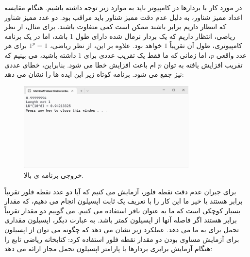 {
    \Large
    \begin{spacing}{1.5}
        در مورد کار با بردارها در کامپیوتر باید به موارد زیر توجه داشته باشیم.
        هنگام مقایسه اعداد ممیز شناور، به دلیل عدم دقت ممیز شناور باید مراقب بود.
        دو عدد ممیز شناور که انتظار داریم برابر باشند ممکن است کمی متفاوت باشند.
        برای مثال، از نظر ریاضی، انتظار داریم که یک بردار نرمال شده دارای طول 1 باشد، اما در یک برنامه کامپیوتری، طول آن تقریباً $1$ خواهد بود.
        علاوه بر این، از نظر ریاضی، $1^p=1$ برای هر عدد واقعی $p$، اما زمانی که ما فقط یک تقریب عددی برای $1$ داشته باشید، می بینیم که تقریب افزایش یافته به توان $p$ ام باعث افزایش خطا می شود.
        بنابراین، خطای عددی نیز جمع می شود. برنامه کوتاه زیر این ایده ها را نشان می دهد:
        \textbf{\vspace{6pt}}
        \lr{}
        \textbf{\vspace{-30pt}}
        \begin{figure}[H]
            \centering
            \setlength{\belowcaptionskip}{-10pt}
            \includegraphics[width=0.8\textwidth]{Images/4/4.Session.1.1.20}
            \caption {خروجی برنامه ی بالا.}
            \label{fig:4.Session.1.1.20}
        \end{figure}

        برای جبران عدم دقت نقطه فلور، آزمایش می کنیم که آیا دو عدد نقطه فلور تقریباً برابر هستند یا خیر
        ما این کار را با تعریف یک ثابت اپسیلون انجام می دهیم، که مقدار بسیار کوچکی است که ما به عنوان بافر استفاده می کنیم.
        می گوییم دو مقدار تقریباً برابر هستند اگر فاصله آنها از اپسیلون کمتر باشد.
        به عبارت دیگر، اپسیلون مقداری تحمل برای  به ما می دهد.
        عملکرد زیر نشان می دهد که چگونه می توان از اپسیلون برای آزمایش مساوی بودن دو مقدار نقطه فلور استفاده کرد:
        \textbf{\vspace{6pt}}
        \lr{}
        \textbf{\vspace{6pt}}
        کتابخانه ریاضی  تابع  را هنگام آزمایش برابری بردارها با پارامتر اپسیلون تحمل مجاز ارائه می دهد:
        \textbf{\vspace{6pt}}
        \lr{}
    \end{spacing}
}

